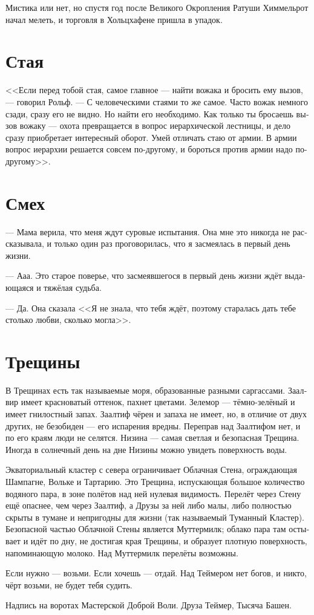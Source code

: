 \documentclass[a4paper,12pt,fleqn]{book}\usepackage{polyglossia}\setdefaultlanguage[babelshorthands=true]{russian}\setotherlanguage{english}\defaultfontfeatures{Ligatures=TeX,Mapping=tex-text}\usepackage{xcolor}\newcommand{\ml}[3]{#2}
\begin{document}
Мистика или нет, но спустя год после Великого Окропления Ратуши Химмельрот начал мелеть, и торговля в Хольцхафене пришла в упадок.

\section{Стая}

<<Если перед тобой стая, самое главное --- найти вожака и бросить ему вызов, --- говорил Рольф.
--- С человеческими стаями то же самое.
Часто вожак немного сзади, сразу его не видно.
Но найти его необходимо.
Как только ты бросаешь вызов вожаку --- охота превращается в вопрос иерархической лестницы, и дело сразу приобретает интересный оборот.
Умей отличать стаю от армии.
В армии вопрос иерархии решается совсем по-другому, и бороться против армии надо по-другому>>. 

\section{Смех}

--- Мама верила, что меня ждут суровые испытания.
Она мне это никогда не рассказывала, и только один раз проговорилась, что я засмеялась в первый день жизни.

--- Ааа.
Это старое поверье, что засмеявшегося в первый день жизни ждёт выдающаяся и тяжёлая судьба.

--- Да.
Она сказала <<Я не знала, что тебя ждёт, поэтому старалась дать тебе столько любви, сколько могла>>.

\section{Трещины}

В Трещинах есть так называемые моря, образованные разными саргассами.
Заалвир имеет красноватый оттенок, пахнет цветами.
Зелемор --- тёмно-зелёный и имеет гнилостный запах.
Заалтиф чёрен и запаха не имеет, но, в отличие от двух других, не безобиден --- его испарения вредны.
Переправ над Заалтифом нет, и по его краям люди не селятся.
Низина --- самая светлая и безопасная Трещина.
Иногда в солнечный день на дне Низины можно увидеть поверхность воды.

Экваториальный кластер с севера ограничивает Облачная Стена, ограждающая Шампагне, Вольке и Тартарию.
Это Трещина, испускающая большое количество водяного пара, в зоне полётов над ней нулевая видимость.
Перелёт через Стену ещё опаснее, чем через Заалтиф, а Друзы за ней либо малы, либо полностью скрыты в тумане и непригодны для жизни (так называемый Туманный Кластер).
Безопасной частью Облачной Стены является Муттермилк;
облако пара там остывает и идёт по дну, не достигая края Трещины, и образует плотную поверхность, напоминающую молоко.
Над Муттермилк перелёты возможны.

\epigraph{
\ml{$0$}
{Если нужно --- возьми.}
{Take if you need.}
\ml{$0$}
{Если хочешь --- отдай.}
{Give if you want.}
\ml{$0$}
{Над Теймером нет богов, и никто, чёрт возьми, не будет тебя судить.}
{There is no gods upon Tejmer, and no one's gonna fucking judge you.}
}
{
Надпись на воротах Мастерской Доброй Воли.
Друза Теймер, Тысяча Башен.
}
\end{document}
